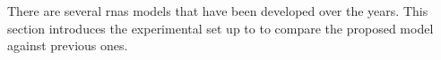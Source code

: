 
There are several \glspl{rna} models that have been
developed over the years. This section introduces the
experimental set up to to compare the proposed model against
previous ones.
